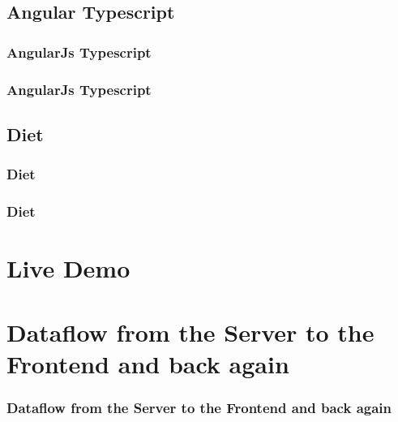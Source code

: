 \documentclass[xelatex,13pt]{beamer}
\begin{document}
\subsection{Angular Typescript}
\begin{frame}
	\frametitle{AngularJs Typescript}
	
	\pause
	
	\pause
	
\end{frame}

\begin{frame}
	\frametitle{AngularJs Typescript}
	
\end{frame}

\subsection{Diet}
\begin{frame}
	\frametitle{Diet}
	
	\pause
	
\end{frame}
\begin{frame}
	\frametitle{Diet}
	
\end{frame}

\section{Live Demo}

\section{Dataflow from the Server to the Frontend and back again}
\begin{frame}
	\frametitle{Dataflow from the Server to the Frontend and back again}
	
	\pause
	
\end{frame}
\end{document}
